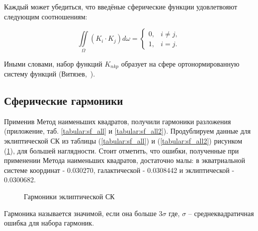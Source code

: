\documentclass[14pt]{article} %
\begin{document}
Каждый может убедиться, что введёные сферические функции удовлетвояют следующим соотношениям:

\begin{equation}
\iint\limits_\Omega \left(K_i \cdot K_j \right) d\omega =  \left\{ \begin{array}{cc}
0, & i \neq j,\\
1, & i = j.
\end{array} \right.
\end{equation}

Иными словами, набор функций $K_{nkp}$ образует на сфере ортонормированную систему функций (Витязев,~\cite{book:sf}). 


\subsection{Сферические гармоники}\label{sistem}  
Применив Метод наименьших квадратов, получили гармоники разложения (приложение, таб. \ref{tabular:sf_all} и \ref{tabular:sf_all2}). Продублируем данные для эклиптической СК из таблицы (\ref{tabular:sf_all}) и (\ref{tabular:sf_all2}) рисунком (\ref{img:sf_j}), для большей наглядности. Стоит отметить, что ошибки, полученные при применении Метода наименьших квадратов, достаточно малы: в экватриальной системе координат - 0.030270, галактической - 0.0308442 и эклиптической - 0.0300682.

\begin{figure}[h!]
\caption{Гармоники эклиптической СК}
\label{img:sf_j}
\end{figure}

Гармоника называется значимой, если она больше $3\sigma$ где, $\sigma$ -- среднеквадратичная ошибка для набора гармоник.
\end{document}
